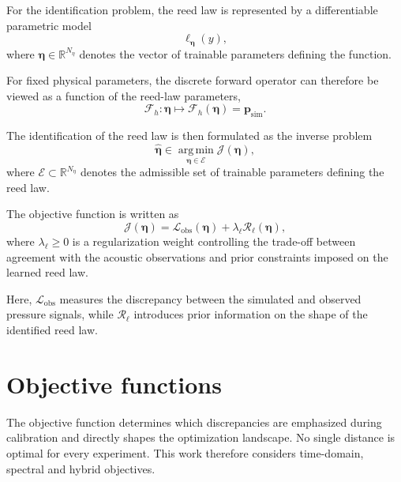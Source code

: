 \documentclass[11pt,a4paper]{report}
\theoremstyle{plain}
\theoremstyle{definition}
\begin{document}
For the identification problem, the reed law is represented by a differentiable
parametric model
\begin{equation}
\ell_{\boldsymbol{\eta}}(y),
\end{equation}
where
\(\boldsymbol{\eta}\in\mathbb{R}^{N_\eta}\)
denotes the vector of trainable parameters defining the function.

For fixed physical parameters, the discrete forward operator can therefore be
viewed as a function of the reed-law parameters,
\begin{equation}
\boxed{
\mathcal{F}_h :
\boldsymbol{\eta}
\longmapsto
\mathcal{F}_h(\boldsymbol{\eta})
=
\mathbf{p}_{\mathrm{sim}}.
}
\label{eq:forward_operator_reed_law}
\end{equation}

The identification of the reed law is then formulated as the inverse problem
\begin{equation}
\boxed{
\widehat{\boldsymbol{\eta}}
\in
\operatorname*{arg\,min}_{\boldsymbol{\eta}\in\mathcal{E}}
\mathcal{J}(\boldsymbol{\eta}),
}
\label{eq:reed_law_inverse_problem}
\end{equation}
where
\(\mathcal{E}\subset\mathbb{R}^{N_\eta}\)
denotes the admissible set of trainable parameters defining the reed law.

The objective function is written as
\begin{equation}
\mathcal{J}(\boldsymbol{\eta})
=
\mathcal{L}_{\mathrm{obs}}(\boldsymbol{\eta})
+
\lambda_{\ell}
\mathcal{R}_{\ell}(\boldsymbol{\eta}),
\label{eq:reed_law_objective_general}
\end{equation}
where \(\lambda_\ell\geq0\) is a regularization weight controlling the
trade-off between agreement with the acoustic observations and prior
constraints imposed on the learned reed law.

Here, \(\mathcal{L}_{\mathrm{obs}}\) measures the discrepancy between the
simulated and observed pressure signals, while \(\mathcal{R}_{\ell}\)
introduces prior information on the shape of the identified reed law.   


\section{Objective functions}
\label{sec:objective_functions}

The objective function determines which discrepancies are emphasized during
calibration and directly shapes the optimization landscape. No single distance
is optimal for every experiment. This work therefore considers time-domain,
spectral and hybrid objectives.
\end{document}
